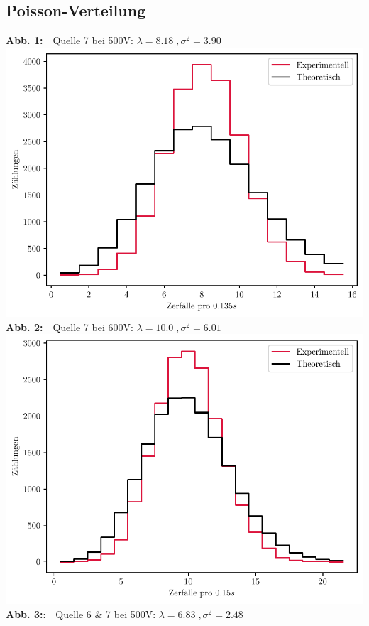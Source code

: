 \documentclass{article}
\begin{document}
	\subsection{Poisson-Verteilung}
	\begin{center}
	\vfill
	\textbf{Abb. 1:}$\quad$Quelle 7 bei 500V: $\lambda=8.18\;,\sigma^2=3.90$	
	\includegraphics[scale=0.8]{Q7_500V_Poi.pdf}
	\vfill
	\textbf{Abb. 2:}$\quad$Quelle 7 bei 600V: $\lambda=10.0\;,\sigma^2=6.01$
	\includegraphics[scale=0.8]{Q7_600V_Poi.pdf}
	\vfill\newpage
	\textbf{Abb. 3:}:$\quad$Quelle 6 \& 7 bei 500V: $\lambda=6.83\;,\sigma^2=2.48$

\end{center}
\end{document}
